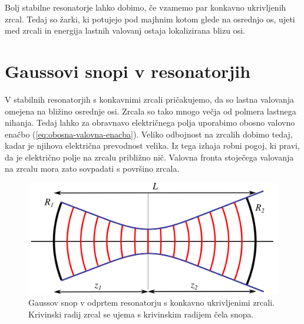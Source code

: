 \noindent
Bolj stabilne resonatorje lahko dobimo, če vzamemo par konkavno ukrivljenih
zrcal. Tedaj so žarki, ki potujejo pod majhnim kotom glede na osrednjo os, ujeti
med zrcali in energija lastnih valovanj ostaja lokalizirana blizu
osi.

\section{Gaussovi snopi v resonatorjih}

V stabilnih resonatorjih s konkavnimi zrcali pričakujemo, da so
lastna valovanja omejena na bližino osrednje osi. Zrcala so tako mnogo 
večja od polmera lastnega nihanja. Tedaj lahko za obravnavo
električnega polja uporabimo obosno valovno enačbo (\ref{eq:obosna-valovna-enacba}). 
Veliko odbojnost na zrcalih dobimo tedaj, kadar je njihova električna prevodnost velika. 
Iz tega izhaja robni pogoj, ki pravi, da je električno polje na zrcalu 
približno nič. Valovna fronta stoječega valovanja na zrcalu mora zato 
sovpadati s površino zrcala.

\begin{figure}[h]
\centering
\includegraphics[width=11truecm]{slike/04_Resonator_Gauss.png}
\caption{Gaussov snop v odprtem resonatorju s konkavno ukrivljenimi zrcali. 
Krivinski radij zrcal se ujema s krivinskim radijem čela snopa.}
\label{fig:Gaussov-snop-v-resonatorju}
\end{figure}

